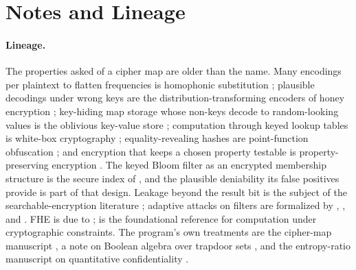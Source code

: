 %

\section{Notes and Lineage}
\label{sec:bib-notes-ch17}

\paragraph{Lineage.}
The properties asked of a cipher map are older than the name. Many
encodings per plaintext to flatten frequencies is homophonic substitution
\parencite{jendal-kuhn-massey-1989}; plausible decodings under wrong keys
are the distribution-transforming encoders of honey encryption
\parencite{juels-ristenpart-2014}; key-hiding map storage whose non-keys
decode to random-looking values is the oblivious key-value store
\parencite{garimella-et-al-2021,bienstock-et-al-2023}; computation through
keyed lookup tables is white-box cryptography \parencite{chow-et-al-2002};
equality-revealing hashes are point-function obfuscation
\parencite{canetti-1997,lynn-prabhakaran-sahai-2004}; and encryption that
keeps a chosen property testable is property-preserving encryption
\parencite{pandey-rouselakis-2012}. The keyed Bloom filter as an encrypted
membership structure is the secure index of \textcite{goh-2003}, and the
plausible deniability its false positives provide is part of that design.
Leakage beyond the result bit is the subject of the searchable-encryption
literature \parencite{curtmola-et-al-2006,cash-et-al-2015,kamara-moataz-ohrimenko-2018};
adaptive attacks on filters are formalized by \textcite{naor-yogev-2015},
\textcite{clayton-patton-shrimpton-2019}, and \textcite{filic-et-al-2022}.
FHE is due to \textcite{gentry-2009}; \textcite{goldreich-1996} is the
foundational reference for computation under cryptographic constraints.
The program's own treatments are the cipher-map manuscript
\parencite{towell-cipher-maps}, a note on Boolean algebra over trapdoor
sets \parencite{towell-boolean-trapdoor}, and the entropy-ratio manuscript
on quantitative confidentiality \parencite{towell-maximizing-confidentiality}.

